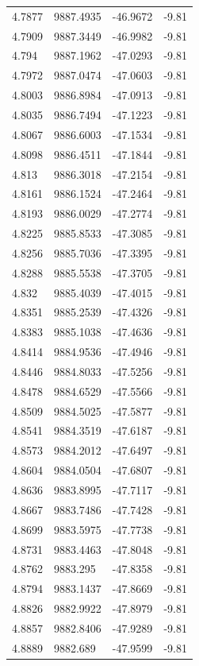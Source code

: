\begin{table}[H]
\begin{tabular}{llll}
4.7877 & 9887.4935 & -46.9672 & -9.81 \\
4.7909 & 9887.3449 & -46.9982 & -9.81 \\
4.794 & 9887.1962 & -47.0293 & -9.81 \\
4.7972 & 9887.0474 & -47.0603 & -9.81 \\
4.8003 & 9886.8984 & -47.0913 & -9.81 \\
4.8035 & 9886.7494 & -47.1223 & -9.81 \\
4.8067 & 9886.6003 & -47.1534 & -9.81 \\
4.8098 & 9886.4511 & -47.1844 & -9.81 \\
4.813 & 9886.3018 & -47.2154 & -9.81 \\
4.8161 & 9886.1524 & -47.2464 & -9.81 \\
4.8193 & 9886.0029 & -47.2774 & -9.81 \\
4.8225 & 9885.8533 & -47.3085 & -9.81 \\
4.8256 & 9885.7036 & -47.3395 & -9.81 \\
4.8288 & 9885.5538 & -47.3705 & -9.81 \\
4.832 & 9885.4039 & -47.4015 & -9.81 \\
4.8351 & 9885.2539 & -47.4326 & -9.81 \\
4.8383 & 9885.1038 & -47.4636 & -9.81 \\
4.8414 & 9884.9536 & -47.4946 & -9.81 \\
4.8446 & 9884.8033 & -47.5256 & -9.81 \\
4.8478 & 9884.6529 & -47.5566 & -9.81 \\
4.8509 & 9884.5025 & -47.5877 & -9.81 \\
4.8541 & 9884.3519 & -47.6187 & -9.81 \\
4.8573 & 9884.2012 & -47.6497 & -9.81 \\
4.8604 & 9884.0504 & -47.6807 & -9.81 \\
4.8636 & 9883.8995 & -47.7117 & -9.81 \\
4.8667 & 9883.7486 & -47.7428 & -9.81 \\
4.8699 & 9883.5975 & -47.7738 & -9.81 \\
4.8731 & 9883.4463 & -47.8048 & -9.81 \\
4.8762 & 9883.295 & -47.8358 & -9.81 \\
4.8794 & 9883.1437 & -47.8669 & -9.81 \\
4.8826 & 9882.9922 & -47.8979 & -9.81 \\
4.8857 & 9882.8406 & -47.9289 & -9.81 \\
4.8889 & 9882.689 & -47.9599 & -9.81 \\

\end{tabular}
\end{table}
